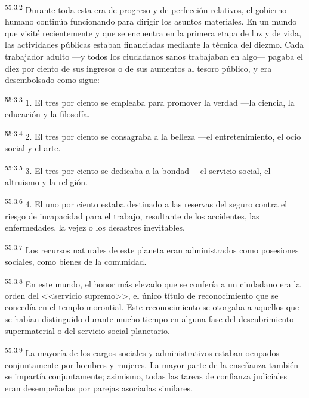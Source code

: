 \par
\textsuperscript{55:3.2} Durante toda esta era de progreso y de perfección relativos, el gobierno humano continúa funcionando para dirigir los asuntos materiales. En un mundo que visité recientemente y que se encuentra en la primera etapa de luz y de vida, las actividades públicas estaban financiadas mediante la técnica del diezmo. Cada trabajador adulto ---y todos los ciudadanos sanos trabajaban en algo--- pagaba el diez por ciento de sus ingresos o de sus aumentos al tesoro público, y era desembolsado como sigue:

\par
\textsuperscript{55:3.3} 1. El tres por ciento se empleaba para promover la verdad ---la ciencia, la educación y la filosofía.

\par
\textsuperscript{55:3.4} 2. El tres por ciento se consagraba a la belleza ---el entretenimiento, el ocio social y el arte.

\par
\textsuperscript{55:3.5} 3. El tres por ciento se dedicaba a la bondad ---el servicio social, el altruismo y la religión.

\par
\textsuperscript{55:3.6} 4. El uno por ciento estaba destinado a las reservas del seguro contra el riesgo de incapacidad para el trabajo, resultante de los accidentes, las enfermedades, la vejez o los desastres inevitables.

\par
\textsuperscript{55:3.7} Los recursos naturales de este planeta eran administrados como posesiones sociales, como bienes de la comunidad.

\par
\textsuperscript{55:3.8} En este mundo, el honor más elevado que se confería a un ciudadano era la orden del <<servicio supremo>>, el único título de reconocimiento que se concedía en el templo morontial. Este reconocimiento se otorgaba a aquellos que se habían distinguido durante mucho tiempo en alguna fase del descubrimiento supermaterial o del servicio social planetario.

\par
\textsuperscript{55:3.9} La mayoría de los cargos sociales y administrativos estaban ocupados conjuntamente por hombres y mujeres. La mayor parte de la enseñanza también se impartía conjuntamente; asimismo, todas las tareas de confianza judiciales eran desempeñadas por parejas asociadas similares.

